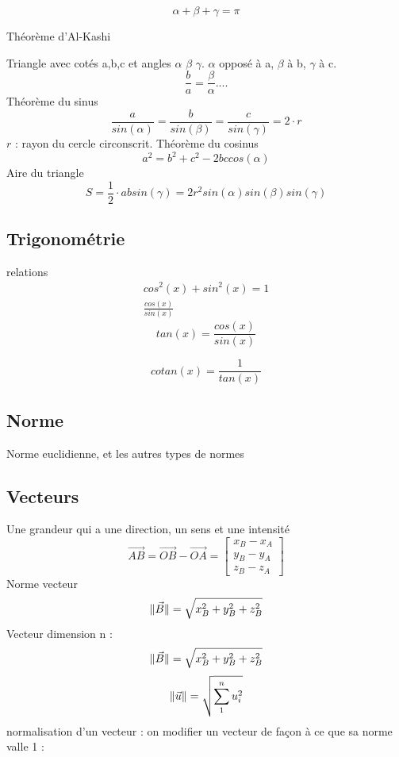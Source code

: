 \begin{equation}
\alpha+\beta+\gamma=\pi
\end{equation}

Théorème d'Al-Kashi



Triangle avec cotés a,b,c et angles $\alpha$ $\beta$ $\gamma$. $\alpha$ opposé à a, $\beta$ à b, $\gamma$ à c. 
\begin{equation}
\frac{b}{a}=\frac{\beta}{\alpha}....
\end{equation}
Théorème du sinus
\begin{equation}
\frac{a}{sin(\alpha)}=\frac{b}{sin(\beta)}=\frac{c}{sin(\gamma)}=2\cdot r
\end{equation}
$r$ : rayon du cercle circonscrit. 
Théorème du cosinus
\begin{equation}
a^2=b^2+c^2 - 2 b c cos(\alpha)
\end{equation}
Aire du triangle
\begin{equation}
S=\frac{1}{2}\cdot a b sin(\gamma)=2r^2sin(\alpha)sin(\beta)sin(\gamma)
\end{equation}
\subsection{Trigonométrie}
relations
\begin{eqnarray}
cos^2(x)+sin^2(x)=1\\
\frac{cos(x)}{sin(x)}
\end{eqnarray}
\begin{equation}
tan(x)=\frac{cos(x)}{sin(x)}
\end{equation}

\begin{equation}
cotan(x)=\frac{1}{tan(x)}
\end{equation}

\subsection{Norme}
Norme euclidienne, et les autres types de normes

\subsection{Vecteurs}
Une grandeur qui a une direction, un sens et une intensité
\begin{equation}
\vec{AB}=\vec{OB}-\vec{OA}=
\begin{bmatrix}
x_B-x_A \\
y_B-y_A\\
z_B-z_A
\end{bmatrix}
\end{equation}
Norme vecteur
\begin{equation}
\lVert\vec{B}\rVert=\sqrt{x_B^2+y_B^2+z_B^2}
\end{equation}
Vecteur dimension n :
\begin{equation}
\lVert\vec{B}\rVert=\sqrt{x_B^2+y_B^2+z_B^2}
\end{equation}
\begin{equation}
\lVert\vec{u}\rVert=\sqrt{\sum_{1}^{n}u_i^2}
\end{equation}
normalisation d'un vecteur : on modifier un vecteur de façon à ce que sa norme valle 1 :

